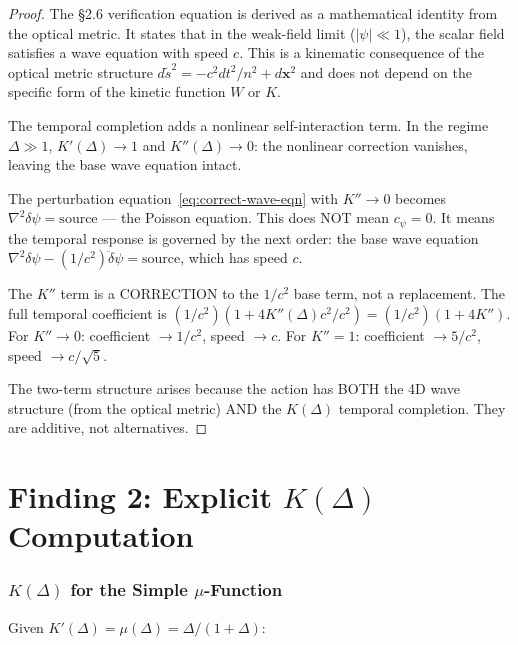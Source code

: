 \documentclass[11pt]{article}
\newcommand{\dpsi}{\delta\psi}
\theoremstyle{definition}
\theoremstyle{remark}
\begin{document}
\begin{proof}
The \S2.6 verification equation is derived as a mathematical identity
from the optical metric. It states that in the weak-field limit
($|\psi| \ll 1$), the scalar field satisfies a wave equation with
speed $c$. This is a kinematic consequence of the optical metric
structure $d\tilde{s}^2 = -c^2dt^2/n^2 + d\mathbf{x}^2$ and does
not depend on the specific form of the kinetic function $W$ or $K$.

The temporal completion adds a nonlinear self-interaction term.
In the regime $\Delta \gg 1$, $K'(\Delta) \to 1$ and $K''(\Delta)
\to 0$: the nonlinear correction vanishes, leaving the base wave
equation intact.

The perturbation equation~\eqref{eq:correct-wave-eqn} with $K'' \to 0$
becomes $\nabla^2\dpsi = \text{source}$ --- the Poisson equation.
This does NOT mean $c_\psi = 0$. It means the temporal response is
governed by the next order: the base wave equation $\nabla^2\dpsi -
(1/c^2)\ddot\dpsi = \text{source}$, which has speed $c$.

The $K''$ term is a CORRECTION to the $1/c^2$ base term, not a
replacement. The full temporal coefficient is $(1/c^2)(1 + 4K''(\Delta)
c^2/c^2) = (1/c^2)(1 + 4K'')$. For $K'' \to 0$: coefficient $\to
1/c^2$, speed $\to c$. For $K'' = 1$: coefficient $\to 5/c^2$,
speed $\to c/\sqrt{5}$.

The two-term structure arises because the action has BOTH the 4D wave
structure (from the optical metric) AND the $K(\Delta)$ temporal
completion. They are additive, not alternatives.
\end{proof}


\part{Finding 2: Explicit $K(\Delta)$ Computation}
\label{part:K-explicit}


\section{$K(\Delta)$ for the Simple $\mu$-Function}

Given $K'(\Delta) = \mu(\Delta) = \Delta/(1+\Delta)$:
\end{document}
